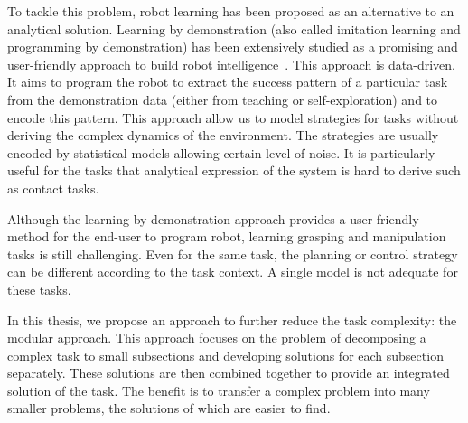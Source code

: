 To tackle this problem, robot learning has been proposed as an alternative to an analytical solution. Learning by demonstration (also called imitation learning and programming by demonstration) has been extensively studied as a promising and user-friendly approach to build robot intelligence~\citep{schaal2003computational,dillmann2004teaching,billard2006discriminative,calinon2007incremental}. This approach is data-driven. It aims to program the robot to extract the success pattern of a particular task from the demonstration data (either from teaching or self-exploration) and to encode this pattern. This approach allow us to model strategies for tasks without deriving the complex dynamics of the environment. The strategies are usually encoded by statistical models allowing certain level of noise. It is particularly useful for the tasks that analytical expression of the system is hard to derive such as contact tasks.


Although the learning by demonstration approach provides a user-friendly method for the end-user to program robot, learning grasping and manipulation tasks is still challenging. Even for the same task, the planning or control strategy can be different according to the task context. A single model is not adequate for these tasks.


In this thesis, we propose an approach to further reduce the task complexity: the modular approach.
This approach focuses on the problem of decomposing a complex task to small subsections and developing solutions for each subsection separately. These solutions are then combined together to provide an integrated solution of the task. The benefit is to transfer a complex problem into many smaller problems, the solutions of which are easier to find.

